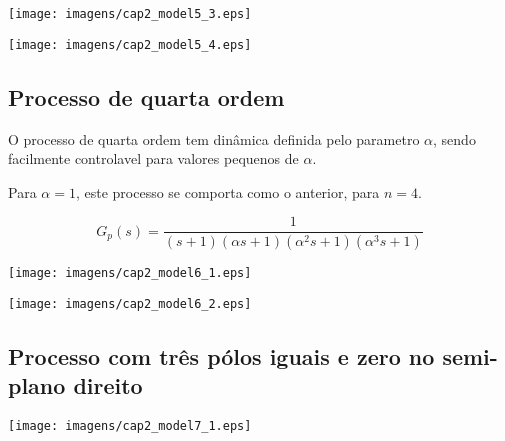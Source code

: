     \begin{center}
        \texttt{[image: imagens/cap2\_model5\_3.eps]}
    \end{center}
    
    \begin{center}
        \texttt{[image: imagens/cap2\_model5\_4.eps]}
    \end{center}

\subsection{Processo de quarta ordem}
    
    O processo de quarta ordem tem dinâmica definida pelo parametro $\alpha$,
    sendo facilmente controlavel para valores pequenos de $\alpha$.
    
    Para $\alpha = 1$, este processo se comporta como o anterior, para $n = 4$.
    
    \begin{equation}
        G_p(s) = \frac{1}{(s+1)(\alpha s+1)(\alpha ^2 s+1)(\alpha ^3 s+1)}
    \end{equation}

    \begin{center}
        \texttt{[image: imagens/cap2\_model6\_1.eps]}
    \end{center}
    
    \begin{center}
        \texttt{[image: imagens/cap2\_model6\_2.eps]}
    \end{center}

\subsection{Processo com três pólos iguais e zero no semi-plano direito}

    \begin{center}
        \texttt{[image: imagens/cap2\_model7\_1.eps]}
    \end{center}

